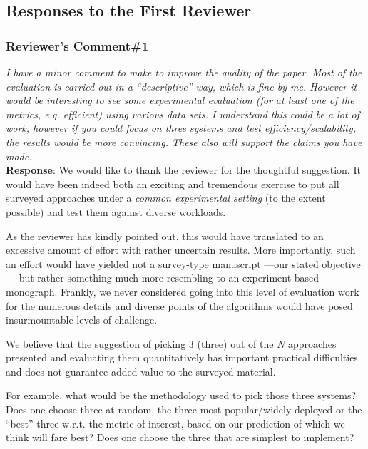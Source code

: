 \documentclass[10pt,letterpaper]{article}
\begin{document}
\subsection*{\textbf{\textsf{Responses to the First Reviewer}}}

\subsubsection*{\textbf{\textsf{Reviewer's Comment\#1}}}
\noindent
\emph{I have a minor comment to make to improve the quality of the paper. Most of
the evaluation is carried out in a ``descriptive'' way, which is fine by me.
However it would be interesting to see some experimental evaluation (for at least
one of the metrics, e.g. efficient) using various data sets. I understand this
could be a lot of work, however if you could focus on three systems and test
efficiency/scalability, the results would be more convincing. These also will
support the claims you have made.}\\[6pt]


\noindent
\textbf{\textsf{Response}}:
We would like to thank the reviewer for the thoughtful suggestion. 
It would have been indeed 
both an exciting and tremendous exercise 
to put all surveyed approaches under a \emph{common experimental setting} 
(to the extent possible) 
and test them against diverse workloads.

As the reviewer has kindly pointed out, this would have 
translated to an excessive amount of effort with rather uncertain results. 
More importantly, such an
effort would have yielded not a survey-type manuscript ---our 
stated objective--- but rather something much more resembling 
to an experiment-based monograph. 
Frankly, we never considered going into this level of evaluation 
work for the numerous details and diverse points of the algorithms 
would have posed insurmountable levels of challenge.

We believe that the suggestion of picking $3$ (three)
out of the $N$ approaches presented and evaluating
them quantitatively has important practical difficulties and 
does not guarantee added value to the surveyed material. 

For example, what would be the methodology used to pick those
three systems? Does one choose three at random, 
the three most popular/widely deployed or
the ``best'' three w.r.t. the metric of interest, 
based on our prediction of which we think will
fare best? 
Does one choose the three that are simplest to implement? 
\end{document}
